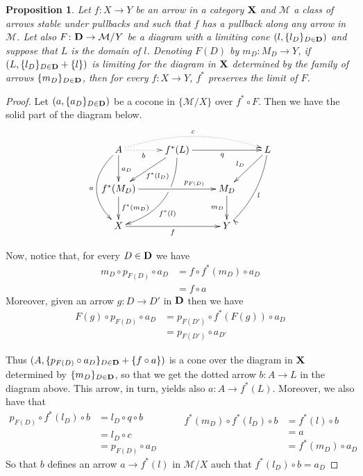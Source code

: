 \documentclass[a4paper]{article}
\def\D{\textbf {\textup{D}}}
\def\X{\textbf {\textup{X}}}
\newtheorem{proposition}[theorem]{Proposition}
\theoremstyle{definition}
\begin{document}
\begin{proposition} Let $f\colon X\to Y$ be an arrow in a category $\X$ and $\mathcal{M}$ a class of arrows stable under pullbacks and such that $f$ has a pullback along any arrow in $\mathcal{M}$. Let also $F\colon\D\to \mathcal{M}/Y$ be a diagram with a limiting cone $(l, \{l_D\}_{D\in \D})$ and suppose that  $L$ is the domain of $l$. Denoting $F(D)$ by  $m_D\colon M_D\to Y$, if  $(L, \{l_D\}_{D\in \D}+\{l\})$ is limiting for the diagram in $\X$ determined by the family of arrows $\{m_D\}_{D\in \D}$, then for every $f\colon X\to Y$, $f^*$ preserves the limit of $F$.
\end{proposition}
\begin{proof}
	Let $(a, \{a_D\}_{D\in \D})$ be a cocone in $\{\mathcal{M}/X\}$ over $f^*\circ F$. Then we have the solid part of the diagram below.
	\[\xymatrix{A \ar@/_.8cm/[dd]_{a}\ar[d]^{a_D}  \ar@{.>}[r]_-{b} \ar@/^.5cm/@{.>}[rrr]^{c}&f^*(L)  \ar@/^.7cm/[ddl]|(.37)\hole^(.6){f^*(l)} \ar[rr]_{q} \ar[dl]^{f^*(l_D)}&&L \ar@/^.3cm/[ddl]^{l} \ar[dl]_{l_D}\\f^*(M_D)  \ar[d]^{f^*(m_D)} \ar[rr]^(.7){p_{F(D)}}&& M_D \ar[d]_{m_D} \\ X \ar[rr]_{f}&& Y }\]
	
	Now, notice that, for every $D\in \D$ we have
	\begin{align*}
		m_D\circ p_{F(D)} \circ a_D&=f\circ f^*(m_D)\circ a_D \\&=f\circ a
	\end{align*}
	Moreover, given an arrow $g\colon D\to D'$ in $\D$ then we have
	\begin{align*}
		F(g)\circ p_{F(D)}\circ a_D&=p_{F(D')}\circ f^*(F(g))\circ a_D\\&=p_{F(D')}\circ a_{D'}
	\end{align*}
	
	Thus $(A, \{p_{F(D)}\circ a_D\}_{D\in \D}+ \{f\circ a\})$ is a cone over the diagram in $\X$ determined by $\{m_D\}_{D\in \D}$, so that we get the dotted arrow $b\colon A\to L$ in the diagram above. This arrow,  in turn, yields also $a\colon A\to f^*(L)$. Moreover, we also have that
	\[
	\begin{split}
		p_{F(D)}\circ f^*(l_D)\circ b&= l_D\circ q \circ b\\&=l_D\circ c\\&=p_{F(D)}\circ a_D
	\end{split}\qquad 
	\begin{split}
		f^*(m_D) \circ f^*(l_D)\circ b&= f^*(l)\circ b\\&=a\\&=f^*(m_D)\circ a_D
	\end{split}
	\]
	So that $b$ defines an arrow $a\to f^*(l)$ in $\mathcal{M}/X$ auch that $f^*(l_D)\circ b =a_D$
	

\end{proof}
\end{document}
